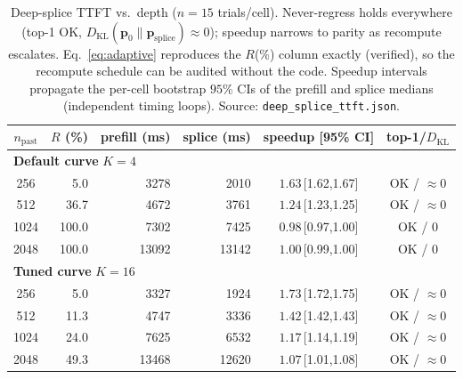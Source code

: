 \documentclass[10pt,conference]{IEEEtran}
\newcommand{\code}[1]{\texttt{\small #1}}
\begin{document}
\begin{table}[t]
\centering
\caption{Deep-splice TTFT vs.\ depth ($n{=}15$ trials/cell). Never-regress holds everywhere
(top-1 OK, $D_{\mathrm{KL}}(\mathbf{p}_0 \parallel \mathbf{p}_{\mathrm{splice}}) \approx 0$); speedup narrows to parity as recompute escalates.
Eq.~\eqref{eq:adaptive} reproduces the $R$(\%) column exactly (verified), so the recompute
schedule can be audited without the code. Speedup intervals propagate the per-cell bootstrap
$95\%$ CIs of the prefill and splice medians (independent timing loops). Source:
\code{deep\_splice\_ttft.json}.}
\label{tab:perf}
\footnotesize
\setlength{\tabcolsep}{3.5pt}
\begin{tabular}{crrrcc}
\toprule
$n_{\mathrm{past}}$ & $R$ (\%) & prefill (ms) & splice (ms) & speedup [95\% CI] & top-1/$D_{\mathrm{KL}}$ \\
\midrule
\multicolumn{6}{l}{\textbf{Default curve} $K=4$} \\
256  & 5.0   & 3278 & 2010 & $1.63$\,{\scriptsize[1.62,1.67]} & OK / $\approx 0$ \\
512  & 36.7  & 4672 & 3761 & $1.24$\,{\scriptsize[1.23,1.25]} & OK / $\approx 0$ \\
1024 & 100.0 & 7302 & 7425 & $0.98$\,{\scriptsize[0.97,1.00]} & OK / $0$ \\
2048 & 100.0 & 13092 & 13142 & $1.00$\,{\scriptsize[0.99,1.00]} & OK / $0$ \\
\midrule
\multicolumn{6}{l}{\textbf{Tuned curve} $K=16$} \\
256  & 5.0   & 3327 & 1924 & $1.73$\,{\scriptsize[1.72,1.75]} & OK / $\approx 0$ \\
512  & 11.3  & 4747 & 3336 & $1.42$\,{\scriptsize[1.42,1.43]} & OK / $\approx 0$ \\
1024 & 24.0  & 7625 & 6532 & $1.17$\,{\scriptsize[1.14,1.19]} & OK / $\approx 0$ \\
2048 & 49.3  & 13468 & 12620 & $1.07$\,{\scriptsize[1.01,1.08]} & OK / $\approx 0$ \\
\bottomrule
\end{tabular}
\end{table}
\end{document}
